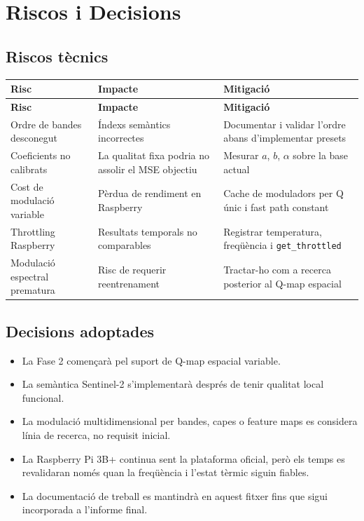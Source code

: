 \documentclass[11pt,a4paper]{article}
\begin{document}
\section{Riscos i Decisions}

\subsection{Riscos tècnics}

\begin{longtable}{p{4.2cm} p{6.1cm} p{4.2cm}}
\toprule
\textbf{Risc} & \textbf{Impacte} & \textbf{Mitigació} \\
\midrule
\endfirsthead
\toprule
\textbf{Risc} & \textbf{Impacte} & \textbf{Mitigació} \\
\midrule
\endhead
Ordre de bandes desconegut & Índexs semàntics incorrectes & Documentar i validar l'ordre abans d'implementar presets \\
Coeficients no calibrats & La qualitat fixa podria no assolir el MSE objectiu & Mesurar $a$, $b$, $\alpha$ sobre la base actual \\
Cost de modulació variable & Pèrdua de rendiment en Raspberry & Cache de moduladors per Q únic i fast path constant \\
Throttling Raspberry & Resultats temporals no comparables & Registrar temperatura, freqüència i \texttt{get\_throttled} \\
Modulació espectral prematura & Risc de requerir reentrenament & Tractar-ho com a recerca posterior al Q-map espacial \\
\bottomrule
\end{longtable}

\subsection{Decisions adoptades}

\begin{itemize}
  \item La Fase 2 començarà pel suport de Q-map espacial variable.
  \item La semàntica Sentinel-2 s'implementarà després de tenir qualitat local funcional.
  \item La modulació multidimensional per bandes, capes o feature maps es considera línia de recerca, no requisit inicial.
  \item La Raspberry Pi 3B+ continua sent la plataforma oficial, però els temps es revalidaran només quan la freqüència i l'estat tèrmic siguin fiables.
  \item La documentació de treball es mantindrà en aquest fitxer fins que sigui incorporada a l'informe final.
\end{itemize}
\end{document}
